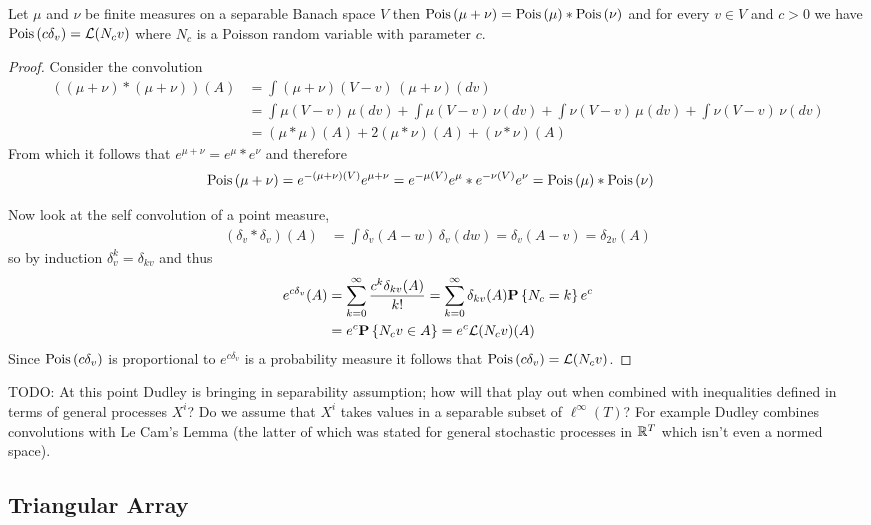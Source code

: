 \begin{prop}\label{PoissonOperator}Let $\mu$ and $\nu$ be finite measures on a separable Banach space $V$ then $\operatorname*{Pois} \left( \mu + \nu \right) = \operatorname*{Pois} \left( \mu \right) * \operatorname*{Pois} \left( \nu \right)$ and for every $v \in V$ and $c > 0$ we have $\operatorname*{Pois} \left( c\delta_v \right) = \mathcal{L}(N_c v)$ where $N_c$ is a Poisson random variable with parameter $c$.
\end{prop}
\begin{proof}
Consider the convolution
\begin{align*}
((\mu + \nu) * (\mu + \nu))(A) &= \int (\mu + \nu)(V - v) \, (\mu + \nu)(dv) \\
&= \int \mu(V - v) \, \mu(dv) + \int \mu(V - v) \, \nu(dv) + \int \nu(V - v) \, \mu(dv) + \int \nu(V - v) \, \nu(dv) \\
&= (\mu * \mu)(A) + 2 (\mu * \nu)(A) + (\nu * \nu)(A)
\end{align*}
From which it follows that $e^{\mu + \nu} = e^{\mu} * e^{\nu}$ and therefore 
\begin{align*}
\operatorname*{Pois} \left( \mu + \nu \right) &= e^{-(\mu + \nu)(V)} e^{\mu + \nu} = e^{-\mu(V)} e^{\mu} * e^{-\nu(V)} e^{\nu} = \operatorname*{Pois} \left( \mu \right) * \operatorname*{Pois} \left( \nu \right)
\end{align*}

Now look at the self convolution of a point measure,
\begin{align*}
(\delta_v * \delta_v)(A) &= \int \delta_v(A - w) \, \delta_v(dw) = \delta_v(A - v) = \delta_{2v}(A)
\end{align*}
so by induction $\delta_v^k = \delta_{kv}$ and thus 
\begin{align*}
e^{c \delta_v} (A) &= \sum_{k=0}^\infty \frac{c^k \delta_{kv}(A)}{k!} = \sum_{k=0}^\infty \delta_{kv}(A) \textbf{P}\left \{N_c = k \right \} e^c \\
&= e^c \textbf{P}\left \{N_c v \in A \right \} = e^c \mathcal{L}(N_c v)(A) 
\end{align*}
Since $\operatorname*{Pois} \left( c \delta_v \right)$ is proportional to $e^{c \delta_v}$ is a probability measure it follows that $\operatorname*{Pois} \left( c \delta_v \right) = \mathcal{L}(N_c v)$.
\end{proof}


TODO: At this point Dudley is bringing in separability assumption; how will that play out when combined with inequalities defined in terms of general processes $X^i$?  Do we assume that $X^i$ takes values in a separable subset of $\ell^\infty(T)$?  For example Dudley combines convolutions with Le Cam's Lemma (the latter of which was stated for general stochastic processes in $\mathbb{R}^T$ which isn't even a normed space).

\subsection{Triangular Array}




